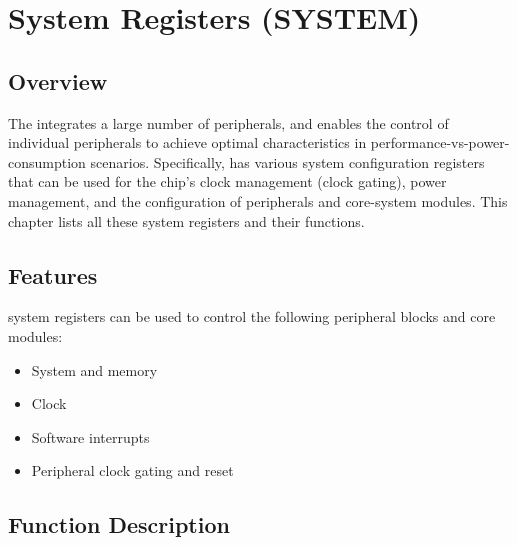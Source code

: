 \documentclass[main\_\_EN.tex]{subfiles}
\begin{document}

\ifglobal
\else
    {\let\clearpage\relax \listoftodos}
    {\let\clearpage\relax \listofdonetodos}
    \tableofcontents
\fi



\chapter{System Registers (SYSTEM)}
\label{mod:sysreg}
\hypertarget{sysreg}{}

\section{Overview}

The \chipname{} integrates a large number of peripherals, and enables the control of individual peripherals to achieve optimal characteristics in performance-vs-power-consumption scenarios. Specifically, \chipname{} has various system configuration registers that can be used for the chip's clock management (clock gating), power management, and the configuration of peripherals and core-system modules. This chapter lists all these system registers and their functions.

\section{Features}

\chipname{} system registers can be used to control the following peripheral blocks and core modules:

\begin{itemize}
    \item System and memory
    \item Clock
    \item Software interrupts
    \item Peripheral clock gating and reset
\end{itemize}


\section{Function Description}
\end{document}
